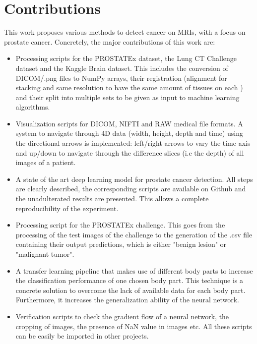 \section{Contributions}
This work proposes various methods to detect cancer on MRIs, with a focus on prostate cancer. Concretely, the major contributions of this work are:
\begin{itemize}
\item Processing scripts for the PROSTATEx dataset, the Lung CT Challenge dataset and the Kaggle Brain dataset. This includes the conversion of DICOM/.png files to NumPy arrays, their registration (alignment for stacking and same resolution to have the same amount of tissues on each ) and their split into multiple sets to be given as input to machine learning algorithms.
\item Visualization scripts for DICOM, NIFTI and RAW medical file formats. A system to navigate through 4D data (width, height, depth and time) using the directional arrows is implemented: left/right arrows to vary the time axis and up/down to navigate through the difference slices (i.e the depth) of all images of a patient.
\item A state of the art deep learning model for prostate cancer detection. All steps are clearly described, the corresponding scripts are available on Github and the unadulterated results are presented. This allows a complete reproducibility of the experiment.
\item Processing script for the PROSTATEx challenge. This goes from the processing of the test images of the challenge to the generation of the .csv file containing their output predictions, which is either "benign lesion" or "malignant tumor".
\item A transfer learning pipeline that makes use of different body parts to increase the classification performance of one chosen body part. This technique is a concrete solution to overcome the lack of available data for each body part. Furthermore, it increases the generalization ability of the neural network.
\item Verification scripts to check the gradient flow of a neural network, the cropping of images, the presence of NaN value in images etc. All these scripts can be easily be imported in other projects.




 
\end{itemize}